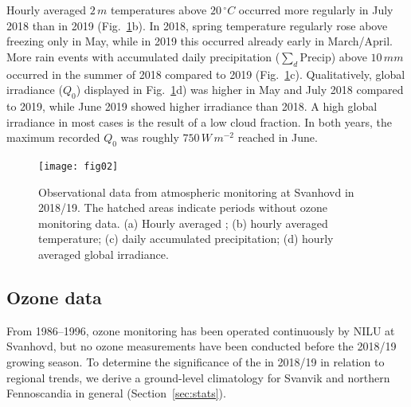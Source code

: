 \documentclass[bg, manuscript]{copernicus}
\begin{document}
Hourly averaged $2\,\unit{m}$ temperatures above $20\,\unit{^\circ C}$ occurred more regularly in July 2018 than in 2019 (Fig.~\ref{fig:data_svanvik_2018_2019}b). In 2018, spring temperature regularly rose above freezing only in May, while in 2019 this occurred already early in March/April.
More rain events with accumulated daily precipitation ($\sum_d \mathrm{Precip}$) above $10\,\unit{mm}$ occurred in the summer of 2018 compared to 2019 (Fig.~\ref{fig:data_svanvik_2018_2019}c).
Qualitatively, global irradiance ($Q_0$) displayed in Fig.~\ref{fig:data_svanvik_2018_2019}d) was higher in May and July 2018 compared to 2019, while June 2019 showed higher irradiance than 2018. A high global irradiance in most cases is the result of a low cloud fraction. In both years, the maximum recorded $Q_0$ was roughly $750\,\unit{W\,m^{-2}}$ reached in June.

\begin{figure}[t]
  \texttt{[image: fig02]}
  \caption{Observational data from atmospheric monitoring at Svanhovd in 2018/19. The hatched areas indicate periods without ozone monitoring data. (a) Hourly averaged \chem{[O_3]}; (b) hourly averaged temperature; (c) daily accumulated precipitation; (d) hourly averaged global irradiance.}
  \label{fig:data_svanvik_2018_2019}
\end{figure}

\subsection{Ozone data}
\label{subsec:ozone_data}
From 1986--1996, ozone monitoring has been operated continuously by NILU at Svanhovd, but no ozone measurements have been conducted before the 2018/19 growing season. To determine the significance of the \chem{[O_3]} in 2018/19 in relation to regional trends, we derive a ground-level \chem{[O_3]} climatology for Svanvik and northern Fennoscandia in general (Section~\ref{sec:stats}). 
\end{document}
